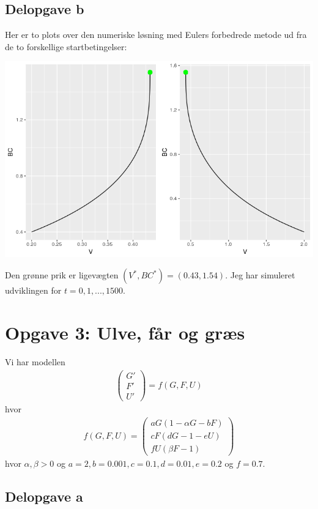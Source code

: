 \documentclass[12pt]{article}
\begin{document}
\subsection{Delopgave b}

Her er to plots over den numeriske løsning med Eulers forbedrede metode ud fra de to forskellige startbetingelser:

\begin{center}
\includegraphics[scale=0.5]{q2p1.png}
\end{center}

Den grønne prik er ligevægten $(V^*, BC^*) = (0.43, 1.54)$. Jeg har simuleret udviklingen for $t=0,1,...,1500$.

\section{Opgave 3: Ulve, får og græs}

Vi har modellen 
\begin{align}
\begin{pmatrix}
G' \\ F' \\ U'
\end{pmatrix} = f(G, F, U)
\end{align}
hvor
\begin{align}
f(G, F, U) = \begin{pmatrix}
aG(1 - \alpha G - bF) \\
cF(dG - 1 - eU) \\
fU(\beta F - 1)
\end{pmatrix}
\end{align}
hvor $\alpha, \beta > 0$ og $a=2, b=0.001, c=0.1, d=0.01, e=0.2$ og $f=0.7$.

\subsection{Delopgave a}
\end{document}

